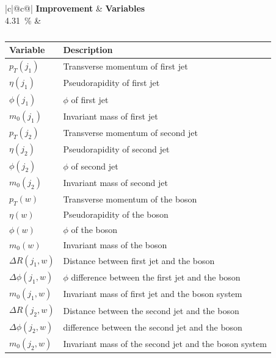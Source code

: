 \begin{table}[h]
    \centering
    \label{tab:app_vars_1}
    \caption{}
    \begin{tabular}{ |c|@{}c@{}| }
        \hline
        \textbf{Improvement} & \textbf{Variables}\\
        \hline
        \SI{4.31}{\%} & 
        \begin{tabular}{ll}
            \hline
            Variable & Description\\
            \hline
            $p_T(j_1)$ & Transverse momentum of first jet\\
            $\eta(j_1)$ & Pseudorapidity of first jet\\
            $\phi(j_1)$ & $\phi$ of first jet\\
            $m_0(j_1)$ & Invariant mass of first jet\\

            $p_T(j_2)$ & Transverse momentum of second jet\\
            $\eta(j_2)$ & Pseudorapidity of second jet\\
            $\phi(j_2)$ & $\phi$ of second jet\\
            $m_0(j_2)$ & Invariant mass of second jet\\
            
            $p_T(w)$ & Transverse momentum of the \PWplus boson\\
            $\eta(w)$ & Pseudorapidity of the \PWplus boson\\
            $\phi(w)$ & $\phi$ of the \PWplus boson\\
            $m_0(w)$ & Invariant mass of the \PWplus boson\\

            $\Delta R(j_1, w)$ & Distance between first jet and the \PWplus boson\\
            $\Delta \phi(j_1, w)$ & $\phi$ difference between the first jet and the \PWplus boson\\
            $m_0(j_1, w)$ & Invariant mass of first jet and the \PWplus boson system\\
            
            $\Delta R(j_2, w)$ & Distance between the second jet and the \PWplus boson\\
            $\Delta \phi(j_2, w)$ & \phi difference between the second jet and the \PWplus boson\\
            $m_0(j_2, w)$ & Invariant mass of the second jet and the \PWplus boson system\\
            \hline
        \end{tabular}\\
        \hline
    \end{tabular}
\end{table}


